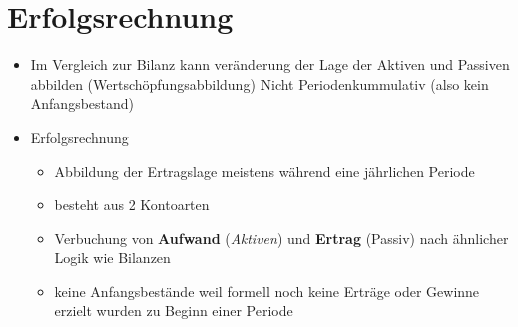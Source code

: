 
\section{Erfolgsrechnung}
\begin{itemize}
    \item Im Vergleich zur Bilanz
        \subitem kann veränderung der Lage der Aktiven und Passiven abbilden (Wertschöpfungsabbildung)
        \subitem Nicht Periodenkummulativ (also kein Anfangsbestand)
    \item Erfolgsrechnung
    \begin{itemize}
            \item Abbildung der Ertragslage meistens während eine jährlichen Periode
            \item besteht aus 2 Kontoarten
            \item Verbuchung von \textbf{Aufwand} (\textit{Aktiven}) und \textbf{Ertrag} (Passiv) nach ähnlicher Logik wie Bilanzen
            \item keine Anfangsbestände weil formell noch keine Erträge oder Gewinne erzielt wurden zu Beginn einer Periode
    \end{itemize}
\end{itemize}
\pagebreak

